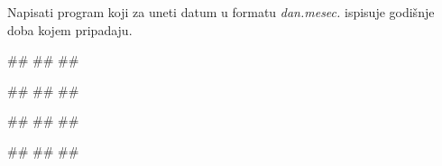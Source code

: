 \begin{Exercise}[label=KT_NG_26] 
Napisati program koji za uneti datum u formatu \textit{dan.mesec.} ispisuje godišnje doba kojem pripadaju. 

\begin{miditest}
\begin{upotreba}{1}
#\naslovInt#
##
##
\end{upotreba}
\end{miditest}
\begin{miditest}
\begin{upotreba}{2}
#\naslovInt#
##
##
\end{upotreba}
\end{miditest}

\begin{miditest}
\begin{upotreba}{3}
#\naslovInt#
##
##
\end{upotreba}
\end{miditest}
\begin{miditest}
\begin{upotreba}{4}
#\naslovInt#
##
##
\end{upotreba}
\end{miditest}

\end{Exercise}
\ifresenja
 \begin{Answer}[ref=KT_NG_26]
\end{Answer}
\fi


